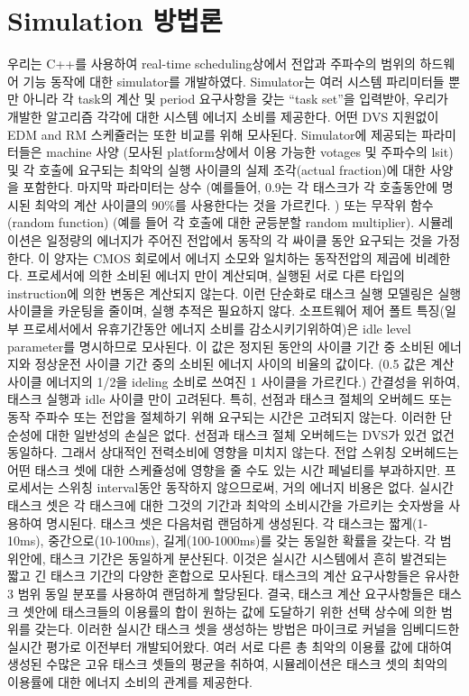 \documentclass[11pt
  , a4paper
  , article
  , oneside
]{memoir}
\begin{document}
\section{Simulation 방법론}
우리는 C++를 사용하여 real-time scheduling상에서 전압과 주파수의 범위의 하드웨어 기능 동작에 대한 simulator를 개발하였다. Simulator는 여러 시스템 파리미터들 뿐만 아니라 각 task의 계산 및 period 요구사항을 갖는 “task set”을 입력받아, 우리가 개발한 알고리즘 각각에 대한 시스템 에너지 소비를 제공한다. 어떤 DVS 지원없이 EDM and RM 스케쥴러는 또한 비교를 위해 모사된다. Simulator에 제공되는 파라미터들은 machine 사양 (모사된 platform상에서 이용 가능한 votages 및 주파수의 lsit) 및 각 호출에 요구되는 최악의 실행 사이클의 실제 조각(actual fraction)에 대한 사양을 포함한다. 마지막 파라미터는 상수 (예를들어, 0.9는 각 태스크가 각 호출동안에 명시된 최악의 계산 사이클의 90\%를 사용한다는 것을 가르킨다. ) 또는 무작위 함수 (random function) (예를 들어 각 호출에 대한 균등분할 random multiplier). 시뮬레이션은 일정량의 에너지가 주어진 전압에서 동작의 각 싸이클 동안 요구되는 것을 가정한다. 이 양자는 CMOS 회로에서 에너지 소모와 일치하는 동작전압의 제곱에 비례한다. 프로세서에 의한 소비된 에너지 만이 계산되며, 실행된 서로 다른 타입의 instruction에 의한 변동은 계산되지 않는다. 이런 단순화로 태스크 실행 모델링은 실행 사이클을 카운팅을 줄이며, 실행 추적은 필요하지 않다. 소프트웨어 제어 폴트 특징(일부 프로세서에서 유휴기간동안 에너지 소비를 감소시키기위하여)은 idle level parameter를 명시하므로 모사된다. 이 값은 정지된 동안의 사이클 기간 중 소비된 에너지와 정상운전 사이클 기간 중의 소비된 에너지 사이의 비율의 값이다. (0.5 값은 계산 사이클 에너지의 1/2을 ideling 소비로 쓰여진 1 사이클을 가르킨다.) 간결성을 위하여, 태스크 실행과 idle 사이클 만이 고려된다. 특히, 선점과 태스크 절체의 오버헤드 또는 동작 주파수 또는 전압을 절체하기 위해 요구되는 시간은 고려되지 않는다. 이러한 단순성에 대한 일반성의 손실은 없다. 선점과 태스크 절체 오버헤드는 DVS가 있건 없건 동일하다. 그래서 상대적인 전력소비에 영향을 미치지 않는다.
전압 스위칭 오버헤드는 어떤 태스크 셋에 대한 스케쥴성에 영향을 줄 수도 있는 시간 페널티를 부과하지만. 프로세서는 스위칭 interval동안 동작하지 않으므로써, 거의 에너지 비용은 없다. 실시간 태스크 셋은 각 태스크에 대한 그것의 기간과 최악의 소비시간을 가르키는 숫자쌍을 사용하여 명시된다. 태스크 셋은 다음처럼 랜덤하게 생성된다. 각 태스크는 짧게(1-10ms), 중간으로(10-100ms), 길게(100-1000ms)를 갖는 동일한 확률을 갖는다. 각 범위안에, 태스크 기간은 동일하게 분산된다. 이것은 실시간 시스템에서 흔히 발견되는 짧고 긴 태스크 기간의 다양한 혼합으로 모사된다. 태스크의 계산 요구사항들은 유사한 3 범위 동일 분포를 사용하여 랜덤하게 할당된다. 결국, 태스크 계산 요구사항들은 태스크 셋안에 태스크들의 이용률의 합이 원하는 값에 도달하기 위한 선택 상수에 의한 범위를 갖는다. 이러한 실시간 태스크 셋을 생성하는 방법은 마이크로 커널을 임베디드한 실시간 평가로 이전부터 개발되어왔다. 여러 서로 다른 총 최악의 이용률 값에 대하여 생성된 수많은 고유 태스크 셋들의 평균을 취하여, 시뮬레이션은 태스크 셋의 최악의 이용률에 대한 에너지 소비의 관계를 제공한다.
\end{document}
